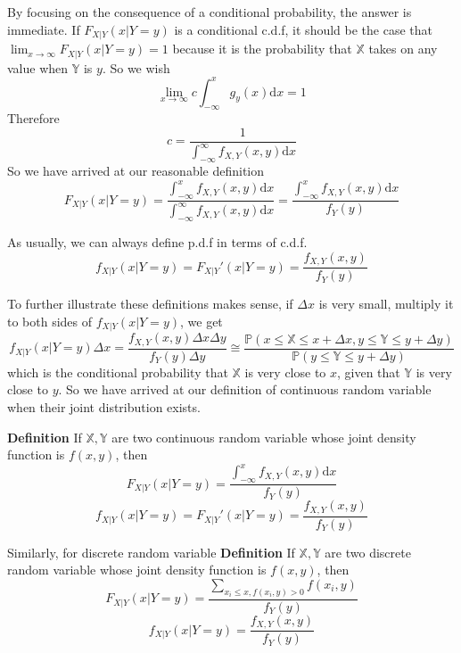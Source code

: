 \documentclass[a4paper,12pt]{article}
\begin{document}
By focusing on the consequence of a conditional probability, the answer is immediate. If $F_{X|Y}(x|Y=y)$ is a conditional c.d.f, it should be the case that $\lim_{x\to\infty}F_{X|Y}(x|Y=y) = 1$ because it is the probability that $\mathbb{X}$ takes on any value when $\mathbb{Y}$ is $y$. So we wish
$$\lim_{x\to\infty} c\int_{-\infty}^x g_y(x) \mathrm{d}x = 1$$
Therefore
$$c = \frac{1}{\int_{-\infty}^\infty f_{X,Y}(x, y)\mathrm{d}x}$$ 
So we have arrived at our reasonable definition
$$F_{X|Y}(x|Y=y) = \frac{\int_{-\infty}^x f_{X,Y}(x, y) \mathrm{d}x}{\int_{-\infty}^\infty f_{X,Y}(x, y)\mathrm{d}x} = \frac{\int_{-\infty}^x f_{X,Y}(x, y) \mathrm{d}x}{f_Y(y)}$$

As usually, we can always define p.d.f in terms of c.d.f. 
$$f_{X|Y}(x|Y=y) = F_{X|Y}'(x|Y=y) = \frac{f_{X,Y}(x, y)}{f_Y(y)}$$

To further illustrate these definitions makes sense, if $\Delta x$ is very small, multiply it to both sides of $f_{X|Y}(x|Y=y)$, we get
$$f_{X|Y}(x|Y=y)\Delta x = \frac{f_{X,Y}(x, y)\Delta x\Delta y}{f_Y(y)\Delta y} \cong \frac{\mathbb{P}(x \leq \mathbb{X} \leq x + \Delta x, y \leq \mathbb{Y} \leq y + \Delta y)}{\mathbb{P}( y \leq \mathbb{Y} \leq y + \Delta y )}$$ 
which is the conditional probability that $\mathbb{X}$ is very close to $x$, given that $\mathbb{Y}$ is very close to $y$. So we have arrived at our definition of continuous random variable when their joint distribution exists. 

\textbf{Definition} If $\mathbb{X}, \mathbb{Y}$ are two continuous random variable whose joint density function is $f(x,y)$, then
$$F_{X|Y}(x|Y=y) = \frac{\int_{-\infty}^x f_{X,Y}(x, y) \mathrm{d}x}{f_Y(y)}$$
$$f_{X|Y}(x|Y=y) = F_{X|Y}'(x|Y=y) = \frac{f_{X,Y}(x, y)}{f_Y(y)}$$

Similarly, for discrete random variable
\textbf{Definition} If $\mathbb{X}, \mathbb{Y}$ are two discrete random variable whose joint density function is $f(x,y)$, then
$$F_{X|Y}(x|Y=y) = \frac{\sum_{x_i \leq x, f(x_i, y)>0} f(x_i, y)}{f_Y(y)}$$
$$f_{X|Y}(x|Y=y) = \frac{f_{X,Y}(x, y)}{f_Y(y)}$$
\end{document}
